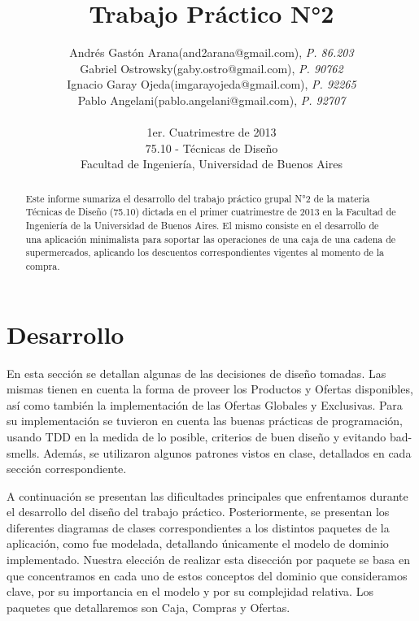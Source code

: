 \documentclass[a4paper,11pt]{article}
\title{\textbf{Trabajo Práctico N°2}}
\author{
  Andrés Gastón Arana(and2arana@gmail.com), \textit{P. 86.203}     \\
  Gabriel Ostrowsky(gaby.ostro@gmail.com), \textit{P. 90762}       \\
  Ignacio Garay Ojeda(imgarayojeda@gmail.com), \textit{P. 92265}   \\
  Pablo Angelani(pablo.angelani@gmail.com), \textit{P. 92707}      \\
  \\
  \normalsize{1er. Cuatrimestre de 2013}                           \\
  \normalsize{75.10 - Técnicas de Diseño}                          \\
  \normalsize{Facultad de Ingeniería, Universidad de Buenos Aires}
}
\date{}
\begin{document}
\thispagestyle{empty}
\maketitle

\begin{abstract}

  Este informe sumariza el desarrollo del trabajo práctico grupal N°2 de la
  materia Técnicas de Diseño (75.10) dictada en el primer cuatrimestre de 2013
  en la Facultad de Ingeniería de la Universidad de Buenos Aires. El mismo
  consiste en el desarrollo de una aplicación minimalista para soportar las
  operaciones de una caja de una cadena de supermercados, aplicando los
  descuentos correspondientes vigentes al momento de la compra.

\end{abstract}

\clearpage

\tableofcontents
\clearpage


\part{Desarrollo}

En esta sección se detallan algunas de las decisiones de diseño tomadas. Las
mismas tienen en cuenta la forma de proveer los Productos y Ofertas
disponibles, así como también la implementación de las Ofertas Globales y
Exclusivas.  Para su implementación se tuvieron en cuenta las buenas prácticas
de programación, usando TDD en la medida de lo posible, criterios de buen
diseño y evitando bad-smells.  Además, se utilizaron algunos patrones vistos en
clase, detallados en cada sección correspondiente.

A continuación se presentan las dificultades principales que enfrentamos
durante el desarrollo del diseño del trabajo práctico. Posteriormente, se
presentan los diferentes diagramas de clases correspondientes a los distintos
paquetes de la aplicación, como fue modelada, detallando únicamente el modelo
de dominio implementado. Nuestra elección de realizar esta disección por
paquete se basa en que concentramos en cada uno de estos conceptos del dominio
que consideramos clave, por su importancia en el modelo y por su complejidad
relativa. Los paquetes que detallaremos son Caja, Compras y Ofertas.
\end{document}
